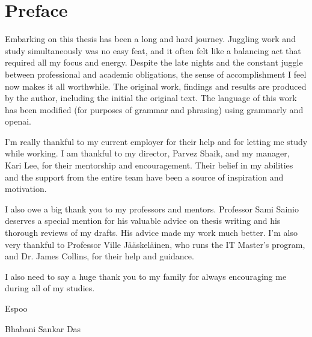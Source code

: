 
\pagestyle{empty}
\chapter*{Preface}

Embarking on this thesis has been a long and hard journey.
Juggling work and study simultaneously was no easy feat, and
it often felt like a balancing act that required all my focus and energy.
Despite the late nights and the constant juggle between professional and
academic obligations, the sense of accomplishment I feel now makes it all
worthwhile. The original work, findings and results are produced by the author,
including the initial the original text. The language of this work has been
modified (for purposes of grammar and phrasing) using
grammarly\cite{Grammarl47:online} and openai\cite{OpenAI35:online}.

I'm really thankful to my current employer for their help and for letting me study while
working. I am thankful to my director, Parvez
Shaik, and my manager, Kari Lee, for their mentorship and encouragement. Their
belief in my abilities and the support from the entire team have been a source
of inspiration and motivation.

I also owe a big thank you to my professors and mentors. Professor Sami Sainio
deserves a special mention for his valuable advice on thesis writing and his
thorough reviews of my drafts. His advice made my work much better. I'm also
very thankful to Professor Ville Jääskeläinen, who runs the IT Master's program,
and Dr. James Collins, for their help and guidance.

I also need to say a huge thank you to my family for always encouraging me
during all of my studies.

Espoo

Bhabani Sankar Das

\clearpage

